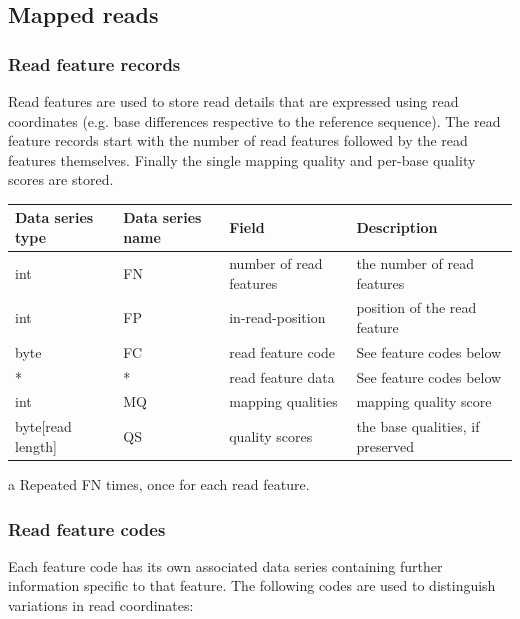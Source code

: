\documentclass[a4paper]{article}
\begin{document}
\subsection{\textbf{Mapped reads}}
\label{subsec:mapped}

\subsubsection*{\textbf{Read feature records}}
\label{subsec:features}

Read features are used to store read details that are expressed using read coordinates 
(e.g. base differences respective to the reference sequence). The read feature 
records start with the number of read features followed by the read features themselves.
Finally the single mapping quality and per-base quality scores are stored.

\begin{threeparttable}[t]
\begin{tabular}{|>{\raggedright}p{88pt}|>{\raggedright}p{83pt}|>{\raggedright}p{85pt}|>{\raggedright}p{180pt}|}
\hline
\textbf{Data series type} & \textbf{Data series name} & \textbf{Field} & \textbf{Description}\tabularnewline
\hline
int & FN & number of read features & the number of read features\tabularnewline
\hline
int & FP & in-read-position\tnote{a} & position of the read feature\tabularnewline 
\hline
byte & FC & read feature code\tnote{a} & See feature codes below\tabularnewline
\hline
* & * & read feature data\tnote{a} & See feature codes below\tabularnewline
\hline
int & MQ & mapping qualities & mapping quality score\tabularnewline
\hline
byte[read length] & QS & quality scores & the base qualities, if preserved\tabularnewline
\hline
\end{tabular}
\begin{tablenotes}
\item[a] Repeated FN times, once for each read feature.
\end{tablenotes}
\end{threeparttable}

\subsubsection*{Read feature codes}

Each feature code has its own associated data series containing further information specific to that feature.
The following codes are used to distinguish variations in read coordinates:
\end{document}
